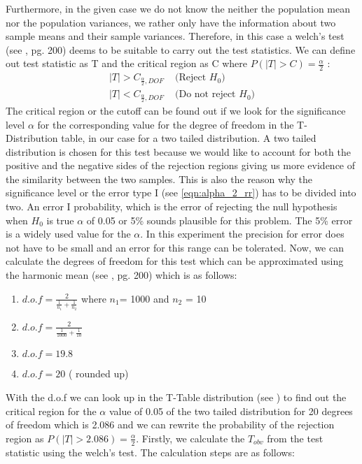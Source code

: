 Furthermore, in the given case we do not know the neither the population mean nor the population variances, we rather only have the information about two sample means and their sample variances. Therefore, in this case a welch's test (see \cite{Iubh:2021}, pg. 200) deems to be suitable to carry out the test statistics. We can define out test statistic as T and the critical region as C where $P(|T| > C) =\frac{\alpha}{2}$ \label{eqn:alpha_2_rr}:
\begin{equation}
    \begin{split}
      |T| > C_{\frac{\alpha}{2}, DOF}& \text{ (Reject $H_0$)}\\
      |T| < C_{\frac{\alpha}{2}, DOF}& \text{ (Do not reject $H_0$)}
    \end{split}
\end{equation}
The critical region or the cutoff can be found out if we look for the significance level $\alpha$ for the corresponding value for the degree of freedom in the T-Distribution table, in our case for a two tailed distribution. A two tailed distribution is chosen for this test because we would like to account for both the positive and the negative sides of the rejection regions giving us more evidence of the similarity between the two samples. This is also the reason why the significance level or the error type I (see \ref{eqn:alpha_2_rr}) has to be divided into two. \newline \newline
An error I probability, which is the error of rejecting the null hypothesis when $H_0$ is true $\alpha$ of 0.05 or 5\% sounds plausible for this problem. The 5\% error is a widely used value for the $\alpha$. In this experiment the precision for error does not have to be small and an error for this range can be tolerated. Now, we can calculate the degrees of freedom for this test which can be approximated using the harmonic mean (see \cite{Iubh:2021}, pg. 200) which is as follows:
\begin{enumerate}
    \item $d.o.f = \frac{2}{\frac{1}{n_1}+\frac{1}{n_2}}$ where $n_1$= 1000 and $n_2$ = 10
    \item $d.o.f = \frac{2}{\frac{1}{1000}+\frac{1}{10}}$
    \item $d.o.f = 19.8$
    \item $d.o.f = 20$ ( rounded up)
\end{enumerate}
With the d.o.f we can look up in the T-Table distribution (see \cite{t-table}) to find out the critical region for the $\alpha$ value of 0.05 of the two tailed distribution for 20 degrees of freedom which is 2.086 and we can rewrite the probability of the rejection region as $P(|T| > 2.086) = \frac{\alpha}{2}$. Firstly, we calculate the $T_{obv}$ from the test statistic using the welch's test. The calculation steps are as follows:
